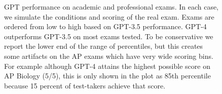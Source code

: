\documentclass{article}
\begin{document}
\begin{figure}[!htbp]
    \centering
    \caption{GPT performance on academic and professional exams. In each case, we simulate the conditions and scoring of the real exam. Exams are ordered from low to high based on GPT-3.5 performance. GPT-4 outperforms GPT-3.5 on most exams tested. To be conservative we report the lower end of the range of percentiles, but this creates some artifacts on the AP exams which have very wide scoring bins. For example although GPT-4 attains the highest possible score on AP Biology (5/5), this is only shown in the plot as 85th percentile because 15 percent of test-takers achieve that score. }
    \label{fig:exams}
\end{figure}
\end{document}
